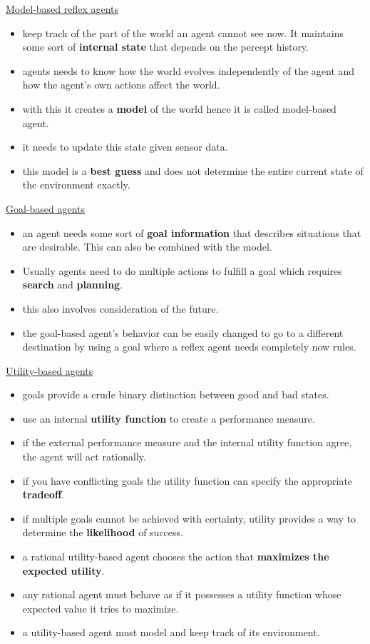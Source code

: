 \underline{Model-based reflex agents}
\begin{itemize}[noitemsep,nolistsep]
	\item keep track of the part of the world an agent cannot see now. It maintains some sort of \textbf{internal state} that depends on the percept history.
	\item agents needs to know how the world evolves independently of the agent and how the agent’s own actions affect the world.
	\item with this it creates a \textbf{model} of the world hence it is called model-based agent.
	\item it needs to update this state given sensor data.
	\item this model is a \textbf{best guess} and does not determine the entire current state of the environment exactly.
\end{itemize}

\underline{Goal-based agents}
\begin{itemize}[noitemsep,nolistsep]
	\item an agent needs some sort of \textbf{goal information} that describes situations that are desirable. This can also be combined with the model.
	\item Usually agents need to do multiple actions to fulfill a goal which requires \textbf{search} and \textbf{planning}.
	\item this also involves consideration of the future.
	\item the goal-based agent’s behavior can be easily changed to go to a different destination by using a goal where a reflex agent needs completely now rules.
\end{itemize}

\underline{Utility-based agents}
\begin{itemize}[noitemsep,nolistsep]
	\item goals provide a crude binary distinction between good and bad states.
	\item use an internal \textbf{utility function} to create a performance measure.
	\item if the external performance measure and the internal utility function agree, the agent will act rationally.
	\item if you have conflicting goals the utility function can specify the appropriate \textbf{tradeoff}.
	\item if multiple goals cannot be achieved with certainty, utility provides a way to determine the \textbf{likelihood} of success.
	\item a rational utility-based agent chooses the action that \textbf{maximizes the expected utility}.
	\item any rational agent must behave as if it possesses a utility function whose expected value it tries to maximize.
	\item a utility-based agent must model and keep track of its environment.
\end{itemize}

